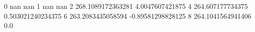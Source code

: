0 nan nan
1 nan nan
2 268.1089172363281 4.0047607421875
4 264.607177734375 0.503021240234375
6 263.2083435058594 -0.89581298828125
8 264.1041564941406 0.0
